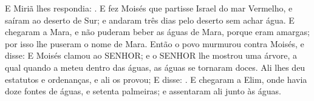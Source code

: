 {  E Miriã lhes respondia: .
  E fez Moisés que partisse Israel do mar Vermelho, e saíram ao deserto de Sur; e andaram três dias pelo deserto sem achar água.
  E chegaram a Mara, e não puderam beber as águas de Mara, porque eram amargas; por isso lhe puseram o nome de Mara.
  Então o povo murmurou contra Moisés, e disse: 
  E Moisés clamou ao SENHOR; e o SENHOR lhe mostrou uma árvore, a qual quando a meteu dentro das águas, as águas se tornaram doces. Ali lhes deu estatutos e ordenanças, e ali os provou;
  E disse: .
  E chegaram a Elim, onde havia doze fontes de águas, e setenta palmeiras; e assentaram ali junto às águas.
\par }

